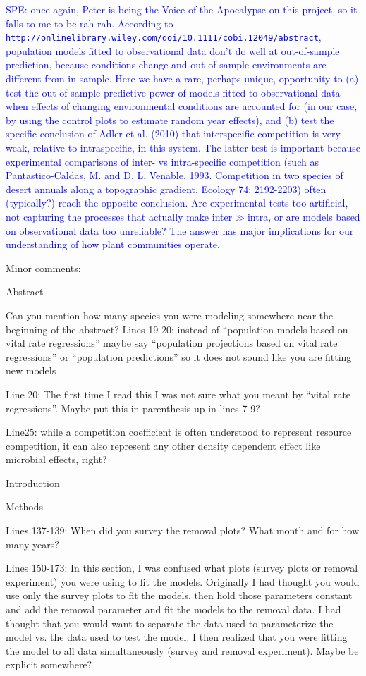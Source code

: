 \documentclass[12pt]{article}
\newcommand{\response}{\textcolor{blue}}
\begin{document}
{\response{SPE: once again, Peter is being the Voice of the Apocalypse on this project, so it falls to me to be rah-rah. According to 
\texttt{http://onlinelibrary.wiley.com/doi/10.1111/cobi.12049/abstract}, population models fitted to observational data don't do well at out-of-sample prediction, because
conditions change and out-of-sample environments are different from in-sample. Here we have a rare, perhaps unique, opportunity to (a) test the out-of-sample predictive power of models fitted
to observational data when effects of changing environmental conditions are accounted for (in our case, by using the control plots to estimate random year effects), 
and (b) test the specific conclusion of Adler et al. (2010) that interspecific competition is very weak, relative to intraspecific, in this system. The latter test is important 
because experimental comparisons of inter- vs intra-specific competition (such as Pantastico-Caldas, M. and D. L. Venable. 1993. Competition in two species of desert annuals along a topographic 
gradient. Ecology 74: 2192-2203) often (typically?) reach the opposite conclusion. Are experimental tests too artificial, not capturing the processes that actually make 
inter$\gg$intra, or are models based on observational data too unreliable? The answer has major implications for our understanding of how plant communities operate.} 


Minor comments:

Abstract

Can you mention how many species you were modeling somewhere near the beginning of the abstract?
Lines 19-20: instead of “population models based on vital rate regressions” maybe say “population projections based on vital rate regressions” or “population predictions” so it does not sound like you are fitting new models

Line 20: The first time I read this I was not sure what you meant by “vital rate regressions”. Maybe put this in parenthesis up in lines 7-9?

Line25: while a competition coefficient is often understood to represent resource competition, it can also represent any other density dependent effect like microbial effects, right?


Introduction

Methods

Lines 137-139:  When did you survey the removal plots? What month and for how many years? 

Lines 150-173: In this section, I was confused what plots (survey plots or removal experiment) you were using to fit the models. Originally I had thought you would use only the survey plots to fit the models, then hold those parameters constant and add the removal parameter and fit the models to the removal data. I had thought that you would want to separate the data used to parameterize the model vs. the data used to test the model. I then realized that you were fitting the model to all data simultaneously (survey and removal experiment). Maybe be explicit somewhere? 

}
\end{document}
